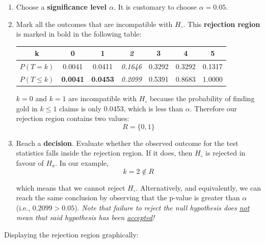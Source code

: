 \begin{enumerate}
\item Choose a \textbf{significance level $\alpha$}. It is customary
  to choose $\alpha=0.05$.

\item\label{it:rejection} Mark all the outcomes that are incompatible
  with $H_\circ$.  This \textbf{rejection region} is marked in bold in
  the following table:

  \begin{center}
  \begin{tabular}{ccccccc}
    k & \textbf{0} & \textbf{1} & \textit{2} & 3 & 4 & 5 \\ \hline
    $P(T=k)$ & 0.0041 & 0.0411 & \textit{0.1646} & 0.3292 & 0.3292 & 0.1317 \\
    $P({T}\leq{k})$ & \textbf{0.0041} & \textbf{0.0453} &
    \textit{0.2099} & 0.5391 & 0.8683 & 1.0000
  \end{tabular}
  \end{center}

  $k=0$ and $k=1$ are incompatible with $H_\circ$ because the
  probability of finding gold in $k\leq{1}$ claims is only 0.0453,
  which is less than $\alpha$. Therefore our rejection region contains
  two values:
  \[
  R = \{0,1\}
  \]

\item\label{it:decision} Reach a \textbf{decision}. Evaluate whether
  the observed outcome for the test statistics falls inside the
  rejection region. If it does, then $H_\circ$ is rejected in favour
  of $H_a$. In our example,
  \[
  k=2\notin{R}
  \]

  \noindent which means that we cannot reject $H_\circ$.
  Alternatively, and equivalently, we can reach the same conclusion by
  observing that the p-value is greater than $\alpha$ (i.e.,
  $0.2099>0.05$). \textit{Note that failure to reject the null
    hypothesis does \underline{not} mean that said hypothesis has been
    \underline{accepted}!}\label{pag:notaccepted}
  
\end{enumerate}

Displaying the rejection region graphically:\medskip

